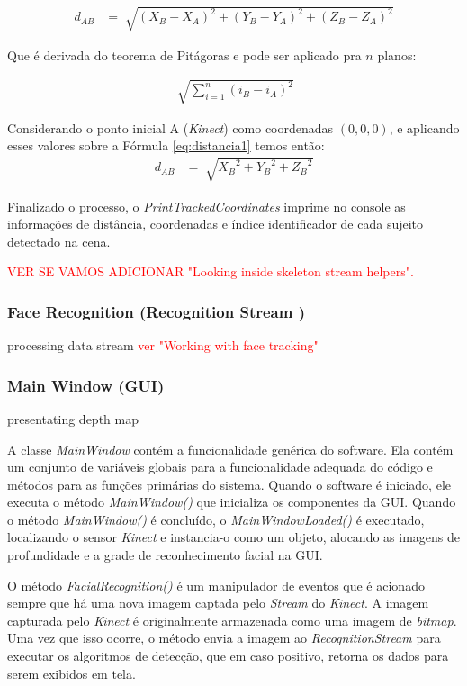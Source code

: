 \begin{align}
    d_{AB} &= \sqrt[]{{(X_{B} - X_{A})}^2 + {(Y_{B} - Y_{A})}^2 + {(Z_{B} - Z_{A})}^2}
    \label{eq:distancia1}
\end{align}

Que é derivada do teorema de Pitágoras e pode ser aplicado pra $n$ planos:

\begin{align}
    \sqrt[]{\sum_{i=1}^{n}{(i_{B} - i_{A})}^2}
    \label{eq:pitagoras}
\end{align}


Considerando o ponto inicial A (\textit{Kinect}) como coordenadas $(0,0,0)$, e aplicando esses valores sobre a Fórmula   \ref{eq:distancia1} temos então:
\begin{align}
    d_{AB} &= \sqrt[]{{X_{B}}^2 + {Y_{B}}^2 + {Z_{B}}^2} 
    \label{eq:distanciaFinal}
\end{align}

Finalizado o processo, o \textit{PrintTrackedCoordinates} imprime no console as informações de distância, coordenadas e índice identificador de cada sujeito detectado na cena.

\textcolor{red}{VER SE VAMOS ADICIONAR "Looking inside skeleton stream helpers". 
}


\subsubsection{Face Recognition (Recognition Stream )}\label{sec:depthDataRecognition}
processing data stream
\textcolor{red}{ver "Working with face tracking" }

\subsubsection{Main Window (GUI)}\label{sec:mainWindow}
presentating depth map


A classe \textit{MainWindow} contém a funcionalidade genérica do software. Ela contém um conjunto de variáveis globais para a funcionalidade adequada do código e métodos para as funções primárias do sistema. Quando o software é iniciado, ele executa o método \textit{MainWindow()} que inicializa os componentes da GUI. Quando o método \textit{MainWindow()} é concluído, o \textit{MainWindowLoaded()} é executado, localizando o sensor \textit{Kinect} e instancia-o como um objeto, alocando as imagens de profundidade e a grade de reconhecimento facial na GUI.

O método \textit{FacialRecognition()} é um manipulador de eventos que é acionado sempre que há uma nova imagem captada pelo \textit{Stream} do \textit{Kinect}. A imagem capturada pelo \textit{Kinect} é originalmente armazenada como uma imagem de \textit{bitmap}. Uma vez que isso ocorre, o método envia a imagem ao \textit{RecognitionStream} para executar os algoritmos de detecção, que em caso positivo, retorna os dados para serem exibidos em tela.


